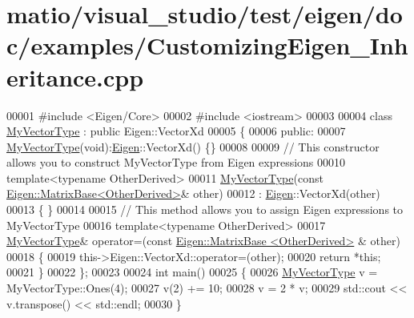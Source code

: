\hypertarget{matio_2visual__studio_2test_2eigen_2doc_2examples_2_customizing_eigen___inheritance_8cpp_source}{}\section{matio/visual\+\_\+studio/test/eigen/doc/examples/\+Customizing\+Eigen\+\_\+\+Inheritance.cpp}
\label{matio_2visual__studio_2test_2eigen_2doc_2examples_2_customizing_eigen___inheritance_8cpp_source}

\begin{DoxyCode}
00001 \textcolor{preprocessor}{#include <Eigen/Core>}
00002 \textcolor{preprocessor}{#include <iostream>}
00003 
00004 \textcolor{keyword}{class }\hyperlink{class_my_vector_type}{MyVectorType} : \textcolor{keyword}{public} Eigen::VectorXd
00005 \{
00006 \textcolor{keyword}{public}:
00007     \hyperlink{class_my_vector_type}{MyVectorType}(\textcolor{keywordtype}{void}):\hyperlink{namespace_eigen}{Eigen}::VectorXd() \{\}
00008 
00009     \textcolor{comment}{// This constructor allows you to construct MyVectorType from Eigen expressions}
00010     \textcolor{keyword}{template}<\textcolor{keyword}{typename} OtherDerived>
00011     \hyperlink{class_my_vector_type}{MyVectorType}(\textcolor{keyword}{const} \hyperlink{group___core___module_class_eigen_1_1_matrix_base}{Eigen::MatrixBase<OtherDerived>}& other)
00012         : \hyperlink{namespace_eigen}{Eigen}::VectorXd(other)
00013     \{ \}
00014 
00015     \textcolor{comment}{// This method allows you to assign Eigen expressions to MyVectorType}
00016     \textcolor{keyword}{template}<\textcolor{keyword}{typename} OtherDerived>
00017     \hyperlink{class_my_vector_type}{MyVectorType}& operator=(\textcolor{keyword}{const} \hyperlink{group___core___module_class_eigen_1_1_matrix_base}{Eigen::MatrixBase <OtherDerived>}
      & other)
00018     \{
00019         this->Eigen::VectorXd::operator=(other);
00020         \textcolor{keywordflow}{return} *\textcolor{keyword}{this};
00021     \}
00022 \};
00023 
00024 \textcolor{keywordtype}{int} main()
00025 \{
00026   \hyperlink{class_my_vector_type}{MyVectorType} v = MyVectorType::Ones(4);
00027   v(2) += 10;
00028   v = 2 * v;
00029   std::cout << v.transpose() << std::endl;
00030 \}
\end{DoxyCode}
